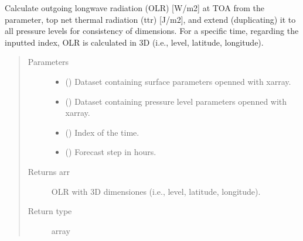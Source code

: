 \documentclass[a4paper,11pt,english]{sphinxmanual}
\begin{document}
\label{\detokenize{modules:module-envlib.processing_surf_vars}}

\begin{fulllineitems}
\label{\detokenize{modules:envlib.processing_surf_vars.extend_olr_pl_4d}}
Calculate outgoing longwave radiation (OLR) {[}W/m2{]} at TOA from the parameter, top net thermal radiation (ttr)
{[}J/m2{]}, and extend (duplicating) it to all pressure levels for consistency of dimensions. For a specific time, 
regarding the inputted index, OLR is calculated in 3D (i.e., level, latitude, longitude).
\begin{quote}\begin{description}
\item[{Parameters}] \leavevmode\begin{itemize}
\item {} 
 () \textendash{} Dataset containing surface parameters openned with xarray.

\item {} 
 () \textendash{} Dataset containing pressure level parameters openned with xarray.

\item {} 
 () \textendash{} Index of the time.

\item {} 
 () \textendash{} Forecast step in hours.

\end{itemize}

\item[{Returns arr}] \leavevmode
OLR with 3D dimensiones (i.e., level, latitude, longitude).

\item[{Return type}] \leavevmode
array

\end{description}\end{quote}

\end{fulllineitems}
\end{document}
